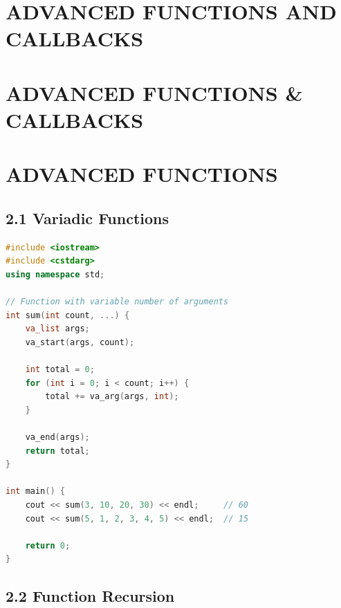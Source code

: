 \hypertarget{advanced-functions-and-callbacks}{%
\chapter{ADVANCED FUNCTIONS AND
CALLBACKS}\label{advanced-functions-and-callbacks}}

\hypertarget{advanced-functions-callbacks}{%
\chapter{ADVANCED FUNCTIONS \&
CALLBACKS}\label{advanced-functions-callbacks}}

\hypertarget{advanced-functions}{%
\chapter{ADVANCED FUNCTIONS}\label{advanced-functions}}

\hypertarget{variadic-functions}{%
\section{2.1 Variadic Functions}\label{variadic-functions}}

\begin{lstlisting}[language={C++}]
#include <iostream>
#include <cstdarg>
using namespace std;

// Function with variable number of arguments
int sum(int count, ...) {
    va_list args;
    va_start(args, count);
    
    int total = 0;
    for (int i = 0; i < count; i++) {
        total += va_arg(args, int);
    }
    
    va_end(args);
    return total;
}

int main() {
    cout << sum(3, 10, 20, 30) << endl;     // 60
    cout << sum(5, 1, 2, 3, 4, 5) << endl;  // 15
    
    return 0;
}
\end{lstlisting}

\hypertarget{function-recursion}{%
\section{2.2 Function Recursion}\label{function-recursion}}

